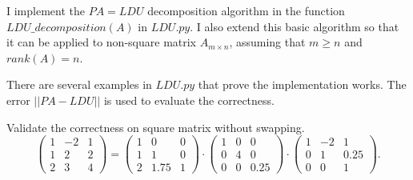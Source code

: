 \documentclass[
  course = {{16-811 Math Fundamentals for Robotics}},
  quartile = {{1}},
  assignment = 1,
  name = {{Kangle Deng}},
  email = {{kangled@andrew.cmu.edu}},
  firstexercise = 1
]{aga-homework}
\begin{document}
\exercise
I implement the $PA=LDU$ decomposition algorithm in the function $LDU\_decomposition(A)$ in $LDU.py$. I also extend this basic algorithm so that it can be applied to non-square matrix $A_{m\times n}$, assuming that $m \ge n$ and $rank(A) = n$.

There are several examples in $LDU.py$ that prove the implementation works. The error $||PA-LDU||$ is used to evaluate the correctness.

\subexercise
Validate the correctness on square matrix without swapping.
\begin{equation*}
    \left(
    \begin{array}{ccc}
        1 & -2 & 1 \\
        1 & 2 & 2 \\
        2 & 3 & 4
    \end{array}
    \right) =
    \left(
    \begin{array}{ccc}
        1 & 0 & 0 \\
        1 & 1 & 0 \\
        2 & 1.75 & 1
    \end{array}
    \right) \cdot
    \left(
    \begin{array}{ccc}
        1 & 0 & 0 \\
        0 & 4 & 0 \\
        0 & 0 & 0.25
    \end{array}
    \right) \cdot
    \left(
    \begin{array}{ccc}
        1 & -2 & 1 \\
        0 & 1 & 0.25 \\
        0 & 0 & 1
    \end{array}
    \right).
\end{equation*}
\end{document}
